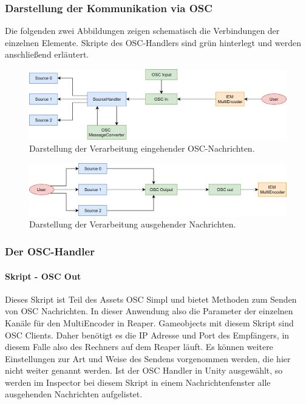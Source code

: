 \documentclass[11pt, titlepage, fleqn]{report}
\begin{document}
                \subsubsection{Darstellung der Kommunikation via OSC}
                    Die folgenden zwei Abbildungen zeigen schematisch die Verbindungen der einzelnen Elemente. Skripte des OSC-Handlers 
                    sind grün hinterlegt und werden anschließend erläutert.
                    \begin{figure}[htbp]
                        \centering
                        \includegraphics[width=\linewidth]{./img/eingehend.png}
                        \caption{Darstellung der Verarbeitung eingehender OSC-Nachrichten.\label{fig:in}}
                    \end{figure}
                    \begin{figure}[htbp]
                        \centering
                        \includegraphics[width=\linewidth]{./img/ausgehend.png}
                        \caption{Darstellung der Verarbeitung ausgehender Nachrichten.\label{fig:out}}
                    \end{figure}
                \subsubsection{Der OSC-Handler}
                    \paragraph{Skript - OSC Out}
                    Dieses Skript ist Teil des Assets OSC Simpl und bietet Methoden zum Senden von OSC Nachrichten. 
                    In dieser Anwendung  also die Parameter der einzelnen Kanäle für den MultiEncoder in Reaper. 
                    Gameobjects mit diesem Skript sind OSC Clients. Daher benötigt es die IP Adresse und Port des 
                    Empfängers, in diesem Falle also des Rechners auf dem Reaper läuft. Es können weitere Einstellungen 
                    zur Art und Weise des Sendens vorgenommen werden, die hier nicht weiter genannt werden.
                    Ist der OSC Handler in Unity ausgewählt, so werden im Inspector bei diesem Skript in einem 
                    Nachrichtenfenster alle ausgehenden Nachrichten aufgelistet.
\end{document}
